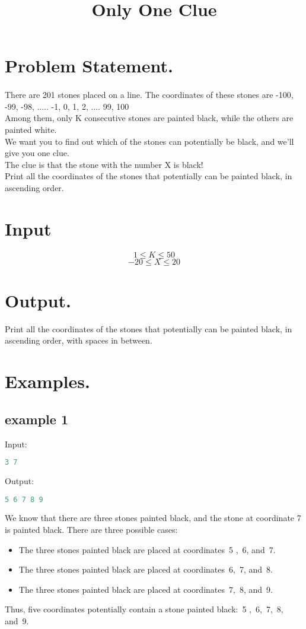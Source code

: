 \documentclass[10pt]{article}
\begin{document}
\title{Only One Clue}
 \date{}
\maketitle
\section{Problem Statement.}
\paragraph{}
There are 201 stones placed on a line. The coordinates of these stones are -100, -99, -98, ..... -1, 0, 1, 2, .... 99, 100\\
Among them, only K consecutive stones are painted black, while the others are painted white.\\
We want you to find out which of the stones can potentially be black, and we’ll give you one clue.\\
The clue is that the stone with the number X is black!\\
Print all the coordinates of the stones that potentially can be painted black, in ascending order.
\section{Input}
$$ 1\le K \le 50 $$
$$ -20\le X \le 20 $$
\section{Output.}
Print all the coordinates of the stones that potentially can be painted black, in ascending order, with spaces in between.
\section{Examples.}
\subsection{example 1}
Input:
\begin{lstlisting}[language=Python]
3 7
\end{lstlisting}
Output:
\begin{lstlisting}[language=Python]
5 6 7 8 9
\end{lstlisting}
We know that there are three stones painted black, and the stone at coordinate 7 is painted black. There are three possible cases:
\begin{itemize}
\item The three stones painted black are placed at coordinates 5 , 6, and 7.
\item The three stones painted black are placed at coordinates 6, 7, and 8.
\item The three stones painted black are placed at coordinates 7, 8, and 9.
\end{itemize}
Thus, five coordinates potentially contain a stone painted black: 5 , 6, 7, 8, and 9.
\end{document}

